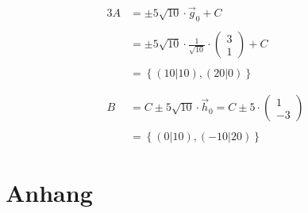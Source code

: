 \documentclass[12pt,a4paper]{scrbook}
\begin{document}
\begin{alignat}{3}
A & = \pm 5 \sqrt{10} \cdot \vec{g}_0 + C \nonumber\\ \nonumber\\
  & = \pm 5 \sqrt{10} \cdot \frac{1}{\sqrt{10}} \cdot \left(\begin{array}{c}3\\1\end{array}\right) + C \nonumber \\ \nonumber\\
  & = \left\{(10 \vert 10), (20 \vert 0) \right\} \nonumber \nonumber\\ \nonumber\\ \nonumber\\
B & = C \pm 5 \sqrt{10} \cdot \vec{h}_0 = C \pm 5 \cdot \left(\begin{array}{c}1\\-3\end{array}\right) \nonumber\\ \nonumber\\
  & = \left\{ (0 \vert 10), (-10 \vert 20) \right\} \nonumber
\end{alignat}

\part{Anhang}
\listoffigures
\end{document}
